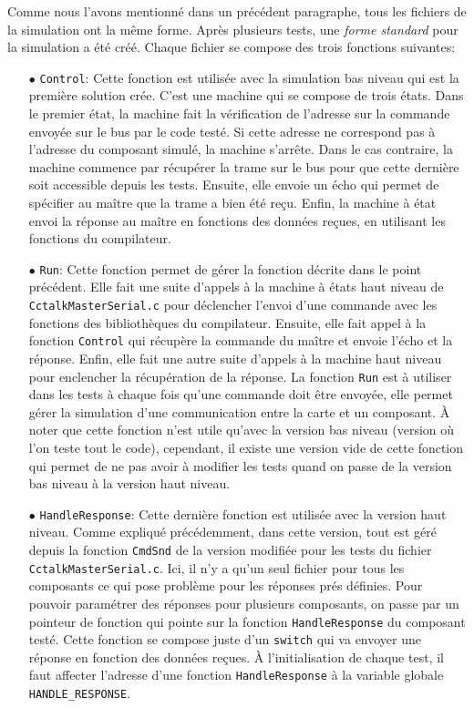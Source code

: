 \documentclass[a4paper]{article}
\begin{document}
Comme nous l'avons mentionné dans un précédent paragraphe, tous les fichiers de
la simulation ont la même forme. Après plusieurs tests, une \textit{forme
standard} pour la simulation a été créé. Chaque fichier se compose des trois
fonctions suivantes:
\begin{itemize}
  \item[$\bullet$] \verb|Control|: Cette fonction est utilisée avec la
    simulation bas niveau qui est la première solution crée. C'est une machine
    qui se compose de trois états. Dans le premier état, la machine fait la
    vérification de l'adresse sur la commande envoyée sur le bus par le code
    testé. Si cette adresse ne correspond pas à l'adresse du composant simulé,
    la machine s'arrête. Dans le cas contraire, la machine commence par
    récupérer la trame sur le bus pour que cette dernière soit accessible depuis
    les tests. Ensuite, elle envoie un écho qui permet de spécifier au maître que
    la trame a bien été reçu. Enfin, la machine à état envoi la réponse au
    maître en fonctions des données reçues, en utilisant les fonctions du
    compilateur. %
  \item[$\bullet$] \verb|Run|: Cette fonction permet de gérer la fonction
    décrite dans le point précédent. Elle fait une suite d'appels à la machine à
    états haut niveau de \verb|CctalkMasterSerial.c| pour déclencher l'envoi
    d'une commande avec les fonctions des bibliothèques du compilateur. Ensuite,
    elle fait appel à la fonction \verb|Control| qui récupère la commande du
    maître et envoie l'écho et la réponse. Enfin, elle fait une autre suite
    d'appels à la machine haut niveau pour enclencher la récupération de la
    réponse. La fonction \verb|Run| est à utiliser dans les tests à chaque fois
    qu'une commande doit être envoyée, elle permet gérer la simulation d'une
    communication entre la carte et un composant. À noter que cette fonction
    n'est utile qu'avec la version bas niveau (version où l'on teste tout le
    code), cependant, il existe une version vide de cette fonction qui permet de
    ne pas avoir à modifier les tests quand on passe de la version bas niveau à
    la version haut niveau.
  \item[$\bullet$] \verb|HandleResponse|: Cette dernière fonction est utilisée
    avec la version haut niveau. Comme expliqué précédemment, dans cette
    version, tout est géré depuis la fonction \verb|CmdSnd| de la version
    modifiée pour les tests du fichier \verb|CctalkMasterSerial.c|. Ici, il n'y
    a qu'un seul fichier pour tous les composants ce qui pose problème pour les
    réponses prés définies. Pour pouvoir paramétrer des réponses pour plusieurs
    composants, on passe par un pointeur de fonction qui pointe sur la fonction
    \verb|HandleResponse| du composant testé. Cette fonction se compose juste
    d'un \verb|switch| qui va envoyer une réponse en fonction des données
    reçues. À l'initialisation de chaque test, il faut affecter l'adresse d'une
    fonction \verb|HandleResponse| à la variable globale \verb|HANDLE_RESPONSE|.
\end{itemize}
\end{document}
